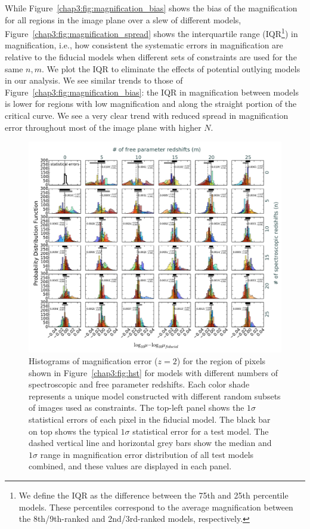While Figure~\ref{chap3:fig:magnification_bias} shows the bias of the magnification for all regions in the image plane over a slew of different models, Figure~\ref{chap3:fig:magnification_spread} shows the interquartile range (IQR\footnote{We define the IQR as the difference between the 75th and 25th percentile models. These percentiles correspond to the average magnification between the 8th/9th-ranked and 2nd/3rd-ranked models, respectively.}) in magnification, i.e., how consistent the systematic errors in magnification are relative to the fiducial models when different sets of constraints are used for the same $n,m$. We plot the IQR to eliminate the effects of potential outlying models in our analysis. We see similar trends to those of Figure~\ref{chap3:fig:magnification_bias}: the IQR in magnification between models is lower for regions with low magnification and along the straight portion of the critical curve. We see a very clear trend with reduced spread in magnification error throughout most of the image plane with higher $N$.

\begin{figure}
\center
\includegraphics[width=1.0\textwidth]{Chap3/c3f8.pdf}
\caption[Histogram of pixelized-magnification errors of test models]{Histograms of magnification error ($z=2$) for the region of pixels shown in Figure~\ref{chap3:fig:hst} for models with different numbers of spectroscopic and free parameter redshifts. Each color shade represents a unique model constructed with different random subsets of images used as constraints. The top-left panel shows the $1\sigma$ statistical errors of each pixel in the fiducial model. The black bar on top shows the typical $1\sigma$ statistical error for a test model. The dashed vertical line and horizontal grey bars show the median and $1\sigma$ range in magnification error distribution of all test models combined, and these values are displayed in each panel.}
\label{chap3:fig:histograms}
\end{figure}

